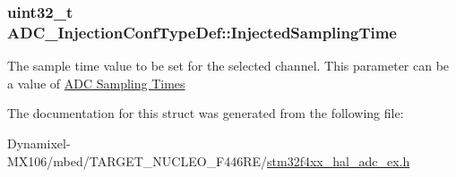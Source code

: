 \subsubsection[{\texorpdfstring{Injected\+Sampling\+Time}{InjectedSamplingTime}}]{\setlength{\rightskip}{0pt plus 5cm}uint32\+\_\+t A\+D\+C\+\_\+\+Injection\+Conf\+Type\+Def\+::\+Injected\+Sampling\+Time}\hypertarget{struct_a_d_c___injection_conf_type_def_a3d15c0590dbafc9e99e21ea4df5b0c6b}{}\label{struct_a_d_c___injection_conf_type_def_a3d15c0590dbafc9e99e21ea4df5b0c6b}
The sample time value to be set for the selected channel. This parameter can be a value of \hyperlink{group___a_d_c__sampling__times}{A\+DC Sampling Times} 

The documentation for this struct was generated from the following file\+:\begin{DoxyCompactItemize}
\item 
Dynamixel-\/\+M\+X106/mbed/\+T\+A\+R\+G\+E\+T\+\_\+\+N\+U\+C\+L\+E\+O\+\_\+\+F446\+R\+E/\hyperlink{stm32f4xx__hal__adc__ex_8h}{stm32f4xx\+\_\+hal\+\_\+adc\+\_\+ex.\+h}\end{DoxyCompactItemize}
